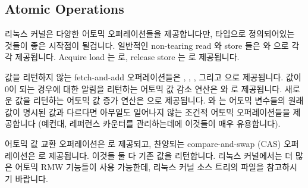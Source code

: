{{{{\subsection{Atomic Operations}
\label{sec:toolsoftrade:Atomic Operations}

리눅스 커널은 다양한 어토믹 오퍼레이션들을 제공합니다만,  타입으로
정의되어있는 것들이 좋은 시작점이 될겁니다.
일반적인 non-tearing read 와 store 들은  와 
으로 각각 제공됩니다.
Acquire load 는  로, release store 는
 로 제공됩니다.

값을 리턴하지 않는 fetch-and-add 오퍼레이션들은 ,
, , 그리고  으로 제공됩니다.
값이 0이 되는 경우에 대한 알림을 리턴하는 어토믹 값 감소 연산은
 와  로 제공됩니다.
새로운 값을 리턴하는 어토믹 값 증가 연산은  으로
제공됩니다.
 와  는 어토믹 변수들의 원래
값이 명시된 값과 다르다면 아무일도 일어나지 않는 조건적 어토믹 오퍼레이션들을
제공합니다 (예컨대, 레퍼런스 카운터를 관리하는데에 이것들이 매우 유용합니다).

어토믹 값 교환 오퍼레이션은  로 제공되고, 찬양되는
compare-and-swap (CAS) 오퍼레이션은  로 제공됩니다.
이것들 둘 다 기존 값을 리턴합니다.
리눅스 커널에서는 더 많은 어토믹 RMW 기능들이 사용 가능한데, 리눅스 커널 소스
트리의  파일을 참고하시기 바랍니다.

}}}}
